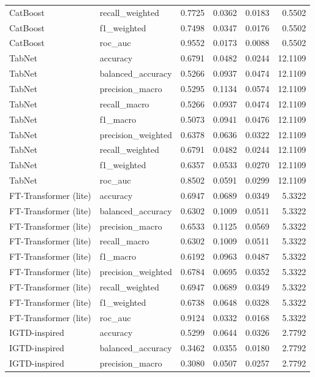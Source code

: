 \begin{tabular}{llrrrr}
CatBoost & recall_weighted & 0.7725 & 0.0362 & 0.0183 & 0.5502 \\
CatBoost & f1_weighted & 0.7498 & 0.0347 & 0.0176 & 0.5502 \\
CatBoost & roc_auc & 0.9552 & 0.0173 & 0.0088 & 0.5502 \\
TabNet & accuracy & 0.6791 & 0.0482 & 0.0244 & 12.1109 \\
TabNet & balanced_accuracy & 0.5266 & 0.0937 & 0.0474 & 12.1109 \\
TabNet & precision_macro & 0.5295 & 0.1134 & 0.0574 & 12.1109 \\
TabNet & recall_macro & 0.5266 & 0.0937 & 0.0474 & 12.1109 \\
TabNet & f1_macro & 0.5073 & 0.0941 & 0.0476 & 12.1109 \\
TabNet & precision_weighted & 0.6378 & 0.0636 & 0.0322 & 12.1109 \\
TabNet & recall_weighted & 0.6791 & 0.0482 & 0.0244 & 12.1109 \\
TabNet & f1_weighted & 0.6357 & 0.0533 & 0.0270 & 12.1109 \\
TabNet & roc_auc & 0.8502 & 0.0591 & 0.0299 & 12.1109 \\
FT-Transformer (lite) & accuracy & 0.6947 & 0.0689 & 0.0349 & 5.3322 \\
FT-Transformer (lite) & balanced_accuracy & 0.6302 & 0.1009 & 0.0511 & 5.3322 \\
FT-Transformer (lite) & precision_macro & 0.6533 & 0.1125 & 0.0569 & 5.3322 \\
FT-Transformer (lite) & recall_macro & 0.6302 & 0.1009 & 0.0511 & 5.3322 \\
FT-Transformer (lite) & f1_macro & 0.6192 & 0.0963 & 0.0487 & 5.3322 \\
FT-Transformer (lite) & precision_weighted & 0.6784 & 0.0695 & 0.0352 & 5.3322 \\
FT-Transformer (lite) & recall_weighted & 0.6947 & 0.0689 & 0.0349 & 5.3322 \\
FT-Transformer (lite) & f1_weighted & 0.6738 & 0.0648 & 0.0328 & 5.3322 \\
FT-Transformer (lite) & roc_auc & 0.9124 & 0.0332 & 0.0168 & 5.3322 \\
IGTD-inspired & accuracy & 0.5299 & 0.0644 & 0.0326 & 2.7792 \\
IGTD-inspired & balanced_accuracy & 0.3462 & 0.0355 & 0.0180 & 2.7792 \\
IGTD-inspired & precision_macro & 0.3080 & 0.0507 & 0.0257 & 2.7792 \\

\end{tabular}

